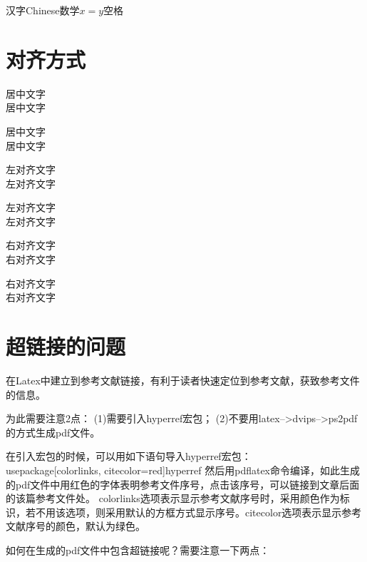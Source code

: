 \documentclass[11pt,a4paper]{article}
\begin{document}
汉字Chinese数学$x=y$空格


\section{对齐方式}
\begin{center}
居中文字 \\
居中文字
\end{center}
 
\noindent
\begin{minipage}{\linewidth}
\centering
居中文字 \\
居中文字
\end{minipage}
 
\begin{flushleft}
左对齐文字 \\
左对齐文字
\end{flushleft}
 
\noindent
\begin{minipage}{\linewidth}
\raggedright
左对齐文字 \\
左对齐文字
\end{minipage}
 
\begin{flushright}
右对齐文字 \\
右对齐文字
\end{flushright}
 
\noindent
\begin{minipage}{\linewidth}
\raggedleft
右对齐文字 \\
右对齐文字
\end{minipage}


\section{超链接的问题}

 在Latex中建立到参考文献链接，有利于读者快速定位到参考文献，获致参考文件的信息。

为此需要注意2点： (1)需要引入hyperref宏包； (2)不要用latex-->dvips-->ps2pdf的方式生成pdf文件。

在引入宏包的时候，可以用如下语句导入hyperref宏包：
\\usepackage[colorlinks, citecolor=red]{hyperref}
然后用pdflatex命令编译，如此生成的pdf文件中用红色的字体表明参考文件序号，点击该序号，可以链接到文章后面的该篇参考文件处。
colorlinks选项表示显示参考文献序号时，采用颜色作为标识，若不用该选项，则采用默认的方框方式显示序号。citecolor选项表示显示参考文献序号的颜色，默认为绿色。

 如何在生成的pdf文件中包含超链接呢？需要注意一下两点：
\end{document}
